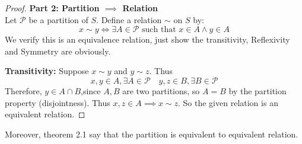 \documentclass[
	UTF-8,
	11pt, %
	a4paper, %
]{LegrandOrangeBook}
\begin{document}
\begin{proof}
\vspace{0.5em}

\textbf{Part 2: Partition $\implies$ Relation} \\
Let $\mathcal{P}$ be a partition of $S$. Define a relation $\sim$ on $S$ by:
$$ x \sim y \iff \exists A \in \mathcal{P} \text{ such that } x \in A \land y \in A $$
We verify this is an equivalence relation, just show the transitivity, Reflexivity and Symmetry are obviously.

\textbf{Transitivity:} Suppose $x \sim y$ and $y \sim z$. Thus 
			$$ x, y \in A , \exists A \in \mathcal{P} \quad y, z \in B, \exists B \in \mathcal{P} $$
		Therefore, $y \in A \cap B$,since  $A, B$ are two partitions, so $A = B$ by the partition property (disjointness). 
		Thus $x,z \in A \implies x\sim z$. So the given relation is an equivalent relation.

\end{proof}

\newpage

Moreover, theorem 2.1 say that the partition is equivalent to equivalent relation.
\end{document}
